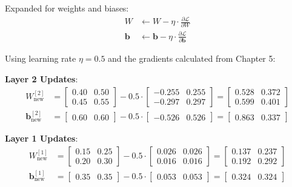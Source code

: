 \documentclass[12pt, a4paper]{report}
\theoremstyle{definition}
\begin{document}
Expanded for weights and biases:
\begin{align}
    W &\leftarrow W - \eta \cdot \frac{\partial \mathcal{L}}{\partial W} \\
    \mathbf{b} &\leftarrow \mathbf{b} - \eta \cdot \frac{\partial \mathcal{L}}{\partial \mathbf{b}}
\end{align}

\begin{numexample}
Using learning rate $\eta = 0.5$ and the gradients calculated from Chapter 5:

\textbf{Layer 2 Updates}:
\begin{align*}
W^{[2]}_\text{new} &= \begin{bmatrix} 0.40 & 0.50 \\ 0.45 & 0.55 \end{bmatrix} - 0.5 \cdot \begin{bmatrix} -0.255 & 0.255 \\ -0.297 & 0.297 \end{bmatrix} = \boxed{\begin{bmatrix} 0.528 & 0.372 \\ 0.599 & 0.401 \end{bmatrix}} \\[6pt]
\mathbf{b}^{[2]}_\text{new} &= \begin{bmatrix} 0.60 & 0.60 \end{bmatrix} - 0.5 \cdot \begin{bmatrix} -0.526 & 0.526 \end{bmatrix} = \boxed{\begin{bmatrix} 0.863 & 0.337 \end{bmatrix}}
\end{align*}

\textbf{Layer 1 Updates}:
\begin{align*}
W^{[1]}_\text{new} &= \begin{bmatrix} 0.15 & 0.25 \\ 0.20 & 0.30 \end{bmatrix} - 0.5 \cdot \begin{bmatrix} 0.026 & 0.026 \\ 0.016 & 0.016 \end{bmatrix} = \boxed{\begin{bmatrix} 0.137 & 0.237 \\ 0.192 & 0.292 \end{bmatrix}} \\[6pt]
\mathbf{b}^{[1]}_\text{new} &= \begin{bmatrix} 0.35 & 0.35 \end{bmatrix} - 0.5 \cdot \begin{bmatrix} 0.053 & 0.053 \end{bmatrix} = \boxed{\begin{bmatrix} 0.324 & 0.324 \end{bmatrix}}
\end{align*}
\end{numexample}
\end{document}
